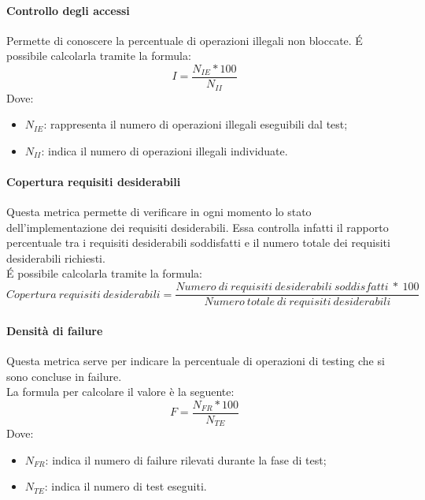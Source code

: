 \documentclass[../NormeDiProgetto.tex]{subfiles}
\begin{document}
			\paragraph{Controllo degli accessi}
				Permette di conoscere la percentuale di operazioni illegali non bloccate.
				É possibile calcolarla tramite la formula:
				\begin{equation*}
					I = \frac{N_{IE} * 100}{N_{II}}
				\end{equation*}
				Dove:
				\begin{itemize}
					\item \textbf{$N_{IE}$}: rappresenta il numero di operazioni illegali eseguibili dal test;
					\item \textbf{$N_{II}$}: indica il numero di operazioni illegali individuate.
				\end{itemize}

			\paragraph{Copertura requisiti desiderabili}
				Questa metrica permette di verificare in ogni momento lo stato dell'implementazione dei requisiti desiderabili. Essa controlla infatti il rapporto percentuale tra i requisiti desiderabili soddisfatti e il numero totale dei requisiti desiderabili richiesti.\\
			É possibile calcolarla tramite la formula:
				\begin{equation*}
					Copertura \ requisiti \ desiderabili = \frac{Numero \ di \ requisiti \ desiderabili \ soddisfatti \ * \ 100}{Numero \ totale \ di \ requisiti \ desiderabili}
				\end{equation*}
				
			\paragraph{Densità di failure}
				Questa metrica serve per indicare la percentuale di operazioni di testing che si sono concluse in failure. \\La formula per calcolare il valore è la seguente:
				\begin{equation*}
					F = \frac{N_{FR} * 100}{N_{TE}}
				\end{equation*}
				Dove:
				\begin{itemize}
					\item \textbf{$N_{FR}$}: indica il numero di failure rilevati durante la fase di test;
					\item \textbf{$N_{TE}$}: indica il numero di test eseguiti.
				\end{itemize}
				
\end{document}
